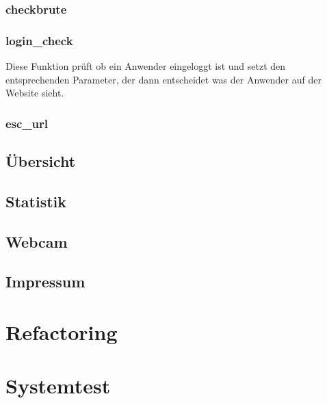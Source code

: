 \subsubsection{checkbrute}

\subsubsection{login\_check}
Diese Funktion prüft ob ein Anwender eingeloggt ist und setzt den entsprechenden
Parameter, der dann entscheidet was der Anwender auf der Website sieht.

\subsubsection{esc\_url}


\subsection{Übersicht}

\subsection{Statistik}

\subsection{Webcam}

\subsection{Impressum}

\section{Refactoring}
\section{Systemtest}
